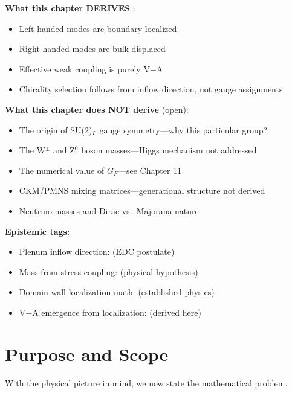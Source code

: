 \begin{tcolorbox}[colback=blue!5, colframe=blue!50!black,
    title=\textbf{Scope of This Chapter}]

\textbf{What this chapter DERIVES} \tagDc{}:
\begin{itemize}[nosep]
    \item Left-handed modes are boundary-localized
    \item Right-handed modes are bulk-displaced
    \item Effective weak coupling is purely V$-$A
    \item Chirality selection follows from inflow direction, not gauge assignments
\end{itemize}

\textbf{What this chapter does NOT derive} (open):
\begin{itemize}[nosep]
    \item The origin of SU(2)$_L$ gauge symmetry---why this particular group?
    \item The W$^\pm$ and Z$^0$ boson masses---Higgs mechanism not addressed
    \item The numerical value of $G_F$---see Chapter 11
    \item CKM/PMNS mixing matrices---generational structure not derived
    \item Neutrino masses and Dirac vs.\ Majorana nature
\end{itemize}

\textbf{Epistemic tags:}
\begin{itemize}[nosep]
    \item Plenum inflow direction: \tagP{} (EDC postulate)
    \item Mass-from-stress coupling: \tagP{} (physical hypothesis)
    \item Domain-wall localization math: \tagBL{} (established physics)
    \item V$-$A emergence from localization: \tagDc{} (derived here)
\end{itemize}
\end{tcolorbox}

\section{Purpose and Scope}
\label{sec:ch9_purpose}

With the physical picture in mind, we now state the mathematical problem.

